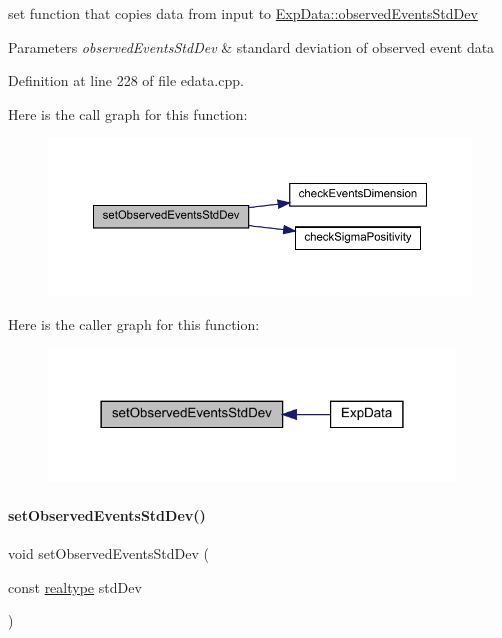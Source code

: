 set function that copies data from input to \mbox{\hyperlink{classamici_1_1_exp_data_abb12a8f75b4e6c936ae6c0be770628c9}{Exp\+Data\+::observed\+Events\+Std\+Dev}}


\begin{DoxyParams}{Parameters}
{\em observed\+Events\+Std\+Dev} & standard deviation of observed event data \\
\hline
\end{DoxyParams}


Definition at line 228 of file edata.\+cpp.

Here is the call graph for this function\+:
\nopagebreak
\begin{figure}[H]
\begin{center}
\leavevmode
\includegraphics[width=350pt]{classamici_1_1_exp_data_af55c1775810031cd4b6e283f6dd220be_cgraph}
\end{center}
\end{figure}
Here is the caller graph for this function\+:
\nopagebreak
\begin{figure}[H]
\begin{center}
\leavevmode
\includegraphics[width=306pt]{classamici_1_1_exp_data_af55c1775810031cd4b6e283f6dd220be_icgraph}
\end{center}
\end{figure}
\mbox{\label{classamici_1_1_exp_data_a7be54ad0b0116325f4955f10a759a018}} 
\paragraph{\texorpdfstring{set\+Observed\+Events\+Std\+Dev()}{setObservedEventsStdDev()}\hspace{0.1cm}{\footnotesize\ttfamily [2/4]}}
{\footnotesize\ttfamily void set\+Observed\+Events\+Std\+Dev (\begin{DoxyParamCaption}\item[{const \mbox{\hyperlink{namespaceamici_a1bdce28051d6a53868f7ccbf5f2c14a3}{realtype}}}]{std\+Dev }\end{DoxyParamCaption})}

